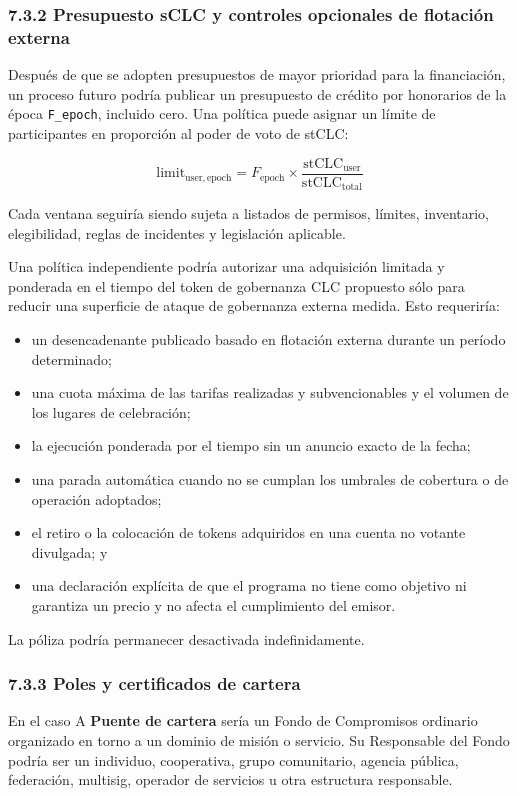 \documentclass[11pt]{article}
\begin{document}
\subsubsection*{7.3.2 Presupuesto sCLC y controles opcionales de flotación externa}

Después de que se adopten presupuestos de mayor prioridad para la financiación, un proceso futuro podría publicar un presupuesto de crédito por honorarios de la época \texttt{F\_epoch}, incluido cero. Una política puede asignar un límite de participantes en proporción al poder de voto de stCLC:

\[
\mathrm{limit}_{\mathrm{user,epoch}} = F_{\mathrm{epoch}} \times \frac{\mathrm{stCLC}_{\mathrm{user}}}{\mathrm{stCLC}_{\mathrm{total}}}
\]

Cada ventana seguiría siendo sujeta a listados de permisos, límites, inventario, elegibilidad, reglas de incidentes y legislación aplicable.

Una política independiente podría autorizar una adquisición limitada y ponderada en el tiempo del token de gobernanza CLC propuesto sólo para reducir una superficie de ataque de gobernanza externa medida. Esto requeriría:

\begin{itemize}[leftmargin=*]
\item un desencadenante publicado basado en flotación externa durante un período determinado;
\item una cuota máxima de las tarifas realizadas y subvencionables y el volumen de los lugares de celebración;
\item la ejecución ponderada por el tiempo sin un anuncio exacto de la fecha;
\item una parada automática cuando no se cumplan los umbrales de cobertura o de operación adoptados;
\item el retiro o la colocación de tokens adquiridos en una cuenta no votante divulgada; y
\item una declaración explícita de que el programa no tiene como objetivo ni garantiza un precio y no afecta el cumplimiento del emisor.
\end{itemize}
La póliza podría permanecer desactivada indefinidamente.

\subsubsection*{7.3.3 Poles y certificados de cartera}

En el caso A \textbf{Puente de cartera} sería un Fondo de Compromisos ordinario organizado en torno a un dominio de misión o servicio. Su Responsable del Fondo podría ser un individuo, cooperativa, grupo comunitario, agencia pública, federación, multisig, operador de servicios u otra estructura responsable.
\end{document}
